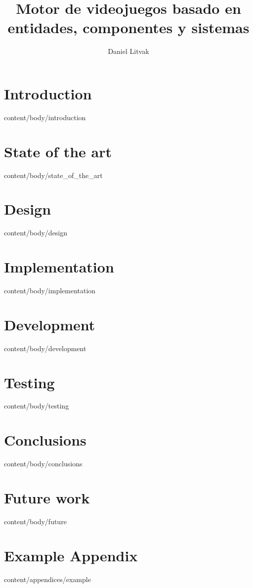 \documentclass[english, tfg, loc, lof, covers, printable, firstnumbered, epsbased]{tfgtfmthesisuam}
\title{Motor de videojuegos basado en entidades, componentes y sistemas}
\author{Daniel Litvak}
\begin{document}



\chapter{Introduction}{content/body/introduction}
\chapter{State of the art}{content/body/state_of_the_art}
\chapter{Design}{content/body/design}
\chapter{Implementation}{content/body/implementation}
\chapter{Development}{content/body/development}
\chapter{Testing}{content/body/testing}
\chapter{Conclusions}{content/body/conclusions}
\chapter{Future work}{content/body/future}

\appendix

\chapter{Example Appendix}{content/appendices/example}
\end{document}
